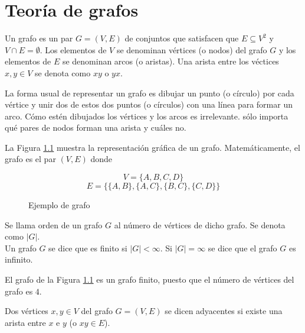 \chapter{Teoría de grafos}

\begin{defi}
Un grafo es un par $G = (V,E)$ de conjuntos que satisfacen que $E \subseteq V^2$ y $V \cap E = \emptyset$. Los elementos de $V$ se denominan vértices (o nodos) del grafo $G$ y los elementos de $E$ se denominan arcos (o aristas). Una arista entre los véctices $x, y \in V$ se denota como $xy$ o $yx$.
\end{defi}

La forma usual de representar un grafo es dibujar un punto (o círculo) por cada vértice y unir dos de estos dos puntos (o círculos) con una línea para formar un arco. Cómo estén dibujados los vértices y los arcos es irrelevante. sólo importa qué pares de nodos forman una arista y cuáles no.

\begin{ejemplo}

La Figura \ref{fig:grafo} muestra la representación gráfica de un grafo. Matemáticamente, el grafo es el par $(V, E)$ donde

\[ V = \{A, B, C, D\} \]
\[ E = \{\{A,B\},\{A,C\},\{B,C\},\{C,D\} \} \]

\begin{figure}[htb]
\centering
\ejemplografo
\caption{Ejemplo de grafo}
\label{fig:grafo}
\end{figure}

\end{ejemplo}

\begin{defi}
Se llama orden de un grafo $G$ al número de vértices de dicho grafo. Se denota como $|G|$.\\
Un grafo $G$ se dice que es finito si $|G| < \infty$. Si $|G| = \infty$ se dice que el grafo $G$ es infinito.
\end{defi}

\begin{ejemplo}
El grafo de la Figura \ref{fig:grafo} es un grafo finito, puesto que el número de vértices del grafo es $4$.
\end{ejemplo}

\begin{defi}
Dos vértices $x,y \in V$ del grafo $G = (V,E)$ se dicen adyacentes si existe una arista entre $x$ e $y$ (o $xy \in E$).
\end{defi}

